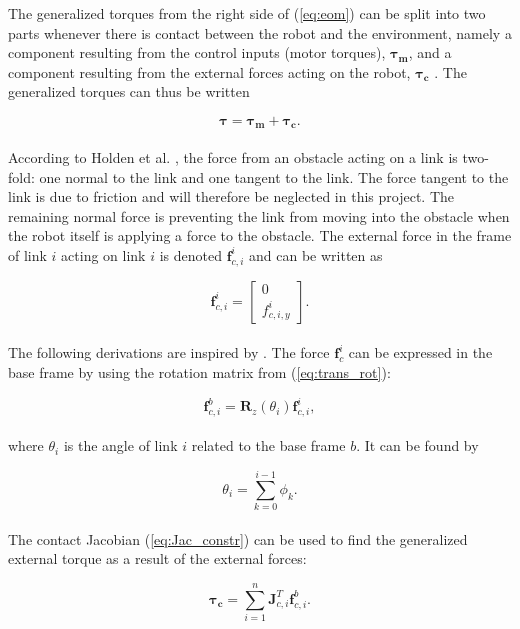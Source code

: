 The generalized torques from the right side of (\ref{eq:eom}) can be split into two parts whenever there is contact between the robot and the environment, namely a component resulting from the control inputs (motor torques), $\boldsymbol{\tau_{m}}$, and a component resulting from the external forces acting on the robot, $\boldsymbol{\tau_{c}}$ \cite{rezapour2014path}. The generalized torques can thus be written

\begin{equation}
    \boldsymbol{\tau} = \boldsymbol{\tau_{m}} + \boldsymbol{\tau_{c}}.
\end{equation}
\\
According to Holden et al. \cite{holden2014optimal}, the force from an obstacle acting on a link is two-fold: one normal to the link and one tangent to the link. The force tangent to the link is due to friction and will therefore be neglected in this project. The remaining normal force is preventing the link from moving into the obstacle when the robot itself is applying a force to the obstacle. The external force in the frame of link $i$ acting on link $i$ is denoted $\mathbf{f}^i_{c,i}$ and can be written as

\begin{equation}
    \mathbf{f}^i_{c,i}=
    \begin{bmatrix}
        0 \\
        f^i_{c,i,y}
    \end{bmatrix}.
\end{equation}
\\
The following derivations are inspired by \cite{rezapour2014path}. The force $\mathbf{f}^i_c$ can be expressed in the base frame by using the rotation matrix from (\ref{eq:trans_rot}):

\begin{equation}
    \mathbf{f}^b_{c,i} = \mathbf{R}_z(\theta_i) \mathbf{f}^i_{c,i},
\end{equation}
\\
where $\theta_i$ is the angle of link $i$ related to the base frame $b$. It can be found by 

\begin{equation}
    \theta_i = \sum_{k=0}^{i-1} \phi_k.
\end{equation}
\\
The contact Jacobian (\ref{eq:Jac_constr}) can be used to find the generalized external torque as a result of the external forces:

\begin{equation}\label{eq:tauforcerel}
    \boldsymbol{\tau_c} = \sum_{i=1}^{n} \mathbf{J}^T_{c,i} \mathbf{f}^b_{c,i}.
\end{equation}

